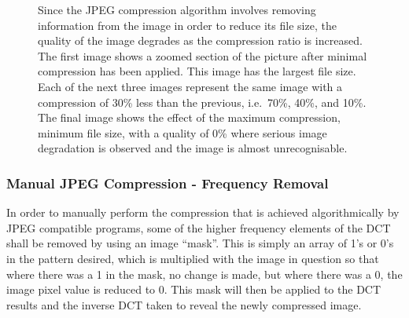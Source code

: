 \begin{figure}[ht]
\begin{minipage}[c]{0.45\linewidth}
	\end{minipage}
	\caption{Since the JPEG compression algorithm involves removing information from the image in order to reduce its file size, the quality of the image degrades as the compression ratio is increased. The first image shows a zoomed section of the picture after minimal compression has been applied. This image has the largest file size. Each of the next three images represent the same image with a compression of 30\% less than the previous, i.e.\ 70\%, 40\%, and 10\%. The final image shows the effect of the maximum compression, minimum file size, with a quality of 0\% where serious image degradation is observed and the image is almost unrecognisable.\label{fig:various_lena}}
\end{figure}

\subsubsection{Manual JPEG Compression - Frequency Removal} %
\label{sub:manual_jpeg_compression_frequency_removal}
In order to manually perform the compression that is achieved algorithmically by JPEG compatible programs, some of the higher frequency elements of the DCT shall be removed by using an image ``mask''. This is simply an array of 1's or 0's in the pattern desired, which is multiplied with the image in question so that where there was a 1 in the mask, no change is made, but where there was a 0, the image pixel value is reduced to 0. This mask will then be applied to the DCT results and the inverse DCT taken to reveal the newly compressed image. 

